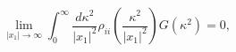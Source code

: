\begin{equation}
\lim_{|x_1| \rightarrow \infty}
\int_0 ^\infty \frac{d\kappa^2}{|x_1|^2} 
\rho_{ii}\left(\frac{\kappa^2}{|x_1|^2}\right) G(\kappa^2)=0,
\label{cluster3}
\end{equation} 
